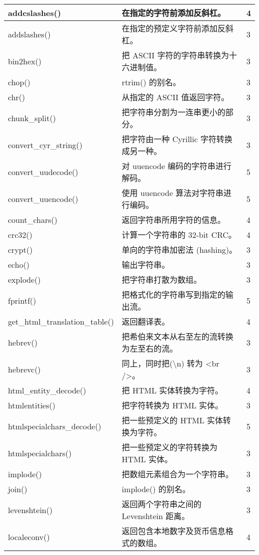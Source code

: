 \begin{longtable}{|m{120pt}|m{250pt}|m{20pt}|}
\hline
addcslashes()				&在指定的字符前添加反斜杠。	&4\\
\hline
addslashes()				&在指定的预定义字符前添加反斜杠。&	3\\
\hline
bin2hex()					&把 ASCII 字符的字符串转换为十六进制值。&	3\\
\hline
chop()						&rtrim() 的别名。	&3\\
\hline
chr()						&从指定的 ASCII 值返回字符。&	3\\
\hline
chunk\_split()				&把字符串分割为一连串更小的部分。&	3\\
\hline
convert\_cyr\_string()		&把字符由一种 Cyrillic 字符转换成另一种。&	3\\
\hline
convert\_uudecode()			&对 uuencode 编码的字符串进行解码。	&5\\
\hline
convert\_uuencode()			&使用 uuencode 算法对字符串进行编码。&	5\\
\hline
count\_chars()				&返回字符串所用字符的信息。	&4\\
\hline
crc32()						&计算一个字符串的 32-bit CRC。&	4\\
\hline
crypt()						&单向的字符串加密法 (hashing)。&	3\\
\hline
echo()						&输出字符串。	&3\\
\hline
explode()					&把字符串打散为数组。&	3\\
\hline
fprintf()						&把格式化的字符串写到指定的输出流。&	5\\
\hline
get\_html\_translation\_table()&返回翻译表。	&4\\
\hline
hebrev()					&把希伯来文本从右至左的流转换为左至右的流。	&3\\
\hline
hebrevc()					&同上，同时把({\textbackslash}n) 转为	<br />。	&3\\
\hline
html\_entity\_decode()		&把 HTML 实体转换为字符。	&4\\
\hline
htmlentities()				&把字符转换为 HTML 实体。&	3\\
\hline
htmlspecialchars\_decode()	&把一些预定义的 HTML 实体转换为字符。&	5\\
\hline
htmlspecialchars()			&把一些预定义的字符转换为 HTML 实体。&	3\\
\hline
implode()					&把数组元素组合为一个字符串。	&3\\
\hline
join()						&implode() 的别名。	&3\\
\hline
levenshtein()				&返回两个字符串之间的 Levenshtein 距离。&	3\\
\hline
localeconv()					&返回包含本地数字及货币信息格式的数组。&	4\\

\end{longtable}
